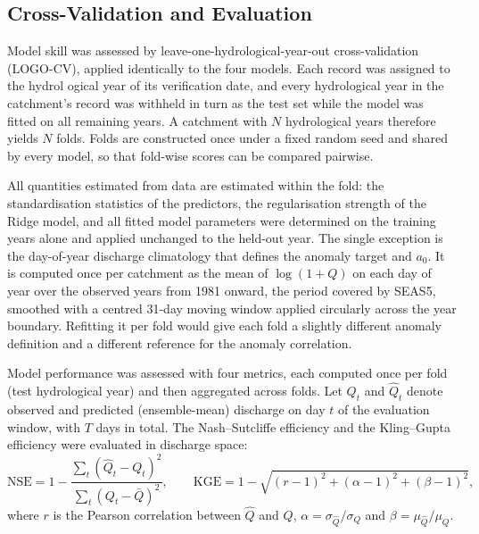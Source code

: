 \documentclass[review,12pt,authoryear]{elsarticle}
\begin{document}
\subsection{Cross-Validation and Evaluation}

Model skill was assessed by leave-one-hydrological-year-out cross-validation (LOGO-CV), applied identically to the four models. Each record was assigned to the hydrol
ogical year of its verification date, and every hydrological year in the catchment's record was withheld in turn as the test set while the model was fitted on all remaining years. A catchment with $N$ hydrological years therefore yields $N$ folds. Folds are constructed once under a fixed random seed and shared by every model, so that fold-wise scores can be compared pairwise.

All quantities estimated from data are estimated within the fold: the standardisation statistics of the predictors, the regularisation strength of the Ridge model, and all fitted model parameters were determined on the training years alone and applied unchanged to the held-out year. The single exception is the day-of-year discharge climatology that defines the anomaly target and $a_{0}$. It is computed once per catchment as the mean of $\log(1+Q)$ on each day of year over the observed years from 1981 onward, the period covered by SEAS5, smoothed with a centred 31-day moving window applied circularly across the year boundary. Refitting it per fold would give each fold a slightly different anomaly definition and a different reference for the anomaly correlation.

Model performance was assessed with four metrics, each computed once per fold (test hydrological year) and then aggregated across folds. Let $Q_t$ and $\hat{Q}_t$ denote observed and predicted (ensemble-mean) discharge on day $t$ of the evaluation window, with $T$ days in total. The Nash--Sutcliffe efficiency \citep[NSE;][]{nash1970} and the Kling--Gupta efficiency \citep[KGE;][]{gupta2009} were evaluated in discharge space:
\begin{equation}
\mathrm{NSE} = 1 - \frac{\sum_t (\hat{Q}_t - Q_t)^2}{\sum_t (Q_t - \bar{Q})^2}, \qquad
\mathrm{KGE} = 1 - \sqrt{(r-1)^2 + (\alpha-1)^2 + (\beta-1)^2},
\end{equation}
where $r$ is the Pearson correlation between $\hat{Q}$ and $Q$, $\alpha = \sigma_{\hat{Q}}/\sigma_Q$ and $\beta = \mu_{\hat{Q}}/\mu_Q$.
\end{document}
